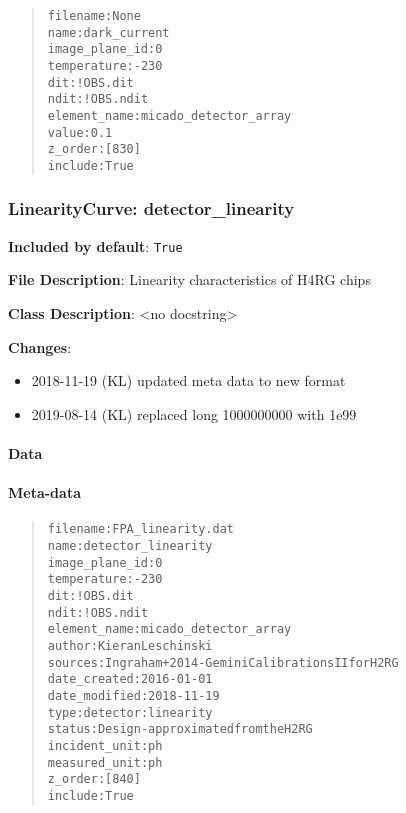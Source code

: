 \documentclass[a4paper]{article}
\begin{document}
\begin{quote}
\begin{alltt}
      filename : None
          name : dark_current
image_plane_id : 0
   temperature : -230
           dit : !OBS.dit
          ndit : !OBS.ndit
  element_name : micado_detector_array
         value : 0.1
       z_order : [830]
       include : True
\end{alltt}
\end{quote}


\subsubsection{LinearityCurve: \textquotedbl{}detector\_linearity\textquotedbl{}%
  \label{linearitycurve-detector-linearity}%
}

\textbf{Included by default}: \texttt{True}

\textbf{File Description}: Linearity characteristics of H4RG chips

\textbf{Class Description}: <no docstring>

\textbf{Changes}:

\begin{itemize}
\item 2018-11-19 (KL) updated meta data to new format

\item 2019-08-14 (KL) replaced long 1000000000 with 1e99
\end{itemize}


\paragraph{Data%
  \label{id33}%
}


\paragraph{Meta-data%
  \label{id34}%
}

\begin{quote}
\begin{alltt}
      filename : FPA_linearity.dat
          name : detector_linearity
image_plane_id : 0
   temperature : -230
           dit : !OBS.dit
          ndit : !OBS.ndit
  element_name : micado_detector_array
        author : Kieran Leschinski
       sources : Ingraham+ 2014 - Gemini Calibrations II for H2RG
  date_created : 2016-01-01
 date_modified : 2018-11-19
          type : detector:linearity
        status : Design - approximated from the H2RG
 incident_unit : ph
 measured_unit : ph
       z_order : [840]
       include : True
\end{alltt}
\end{quote}
\end{document}
